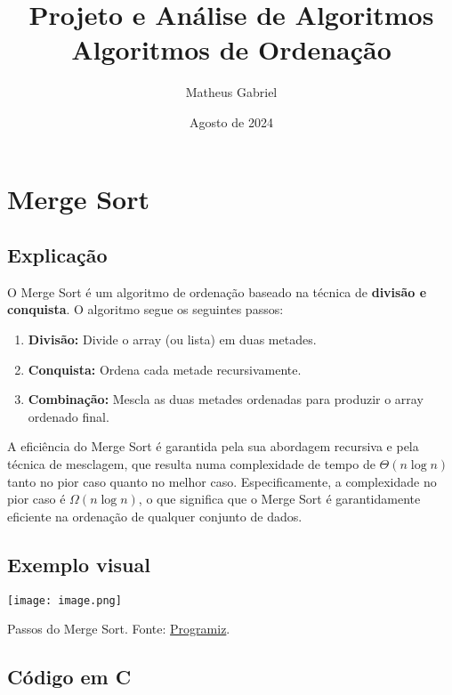 \documentclass{article}
\title{Projeto e Análise de Algoritmos \\
\large Algoritmos de Ordenação}
\author{Matheus Gabriel}
\date{Agosto de 2024}
\begin{document}
\maketitle

\section{Merge Sort}
\subsection{Explicação}
O Merge Sort é um algoritmo de ordenação baseado na técnica de \textbf{divisão e conquista}. O algoritmo segue os seguintes passos:

\begin{enumerate}
    \item \textbf{Divisão:} Divide o array (ou lista) em duas metades.
    \item \textbf{Conquista:} Ordena cada metade recursivamente.
    \item \textbf{Combinação:} Mescla as duas metades ordenadas para produzir o array ordenado final.
\end{enumerate}

A eficiência do Merge Sort é garantida pela sua abordagem recursiva e pela técnica de mesclagem, que resulta numa complexidade de tempo de \(\Theta(n \log n)\) tanto no pior caso quanto no melhor caso. Especificamente, a complexidade no pior caso é \(\Omega(n \log n)\), o que significa que o Merge Sort é garantidamente eficiente na ordenação de qualquer conjunto de dados.

\subsection{Exemplo visual}

\begin{minipage}{\textwidth}
    \texttt{[image: image.png]}
\end{minipage}
Passos do Merge Sort. Fonte: \href{https://www.programiz.com/dsa/merge-sort}{Programiz}.


\subsection{Código em C}
\end{document}

